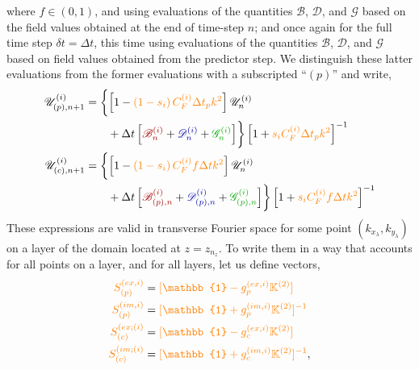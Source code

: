 \documentclass[12pt, letterpaper, oneside, leqno, openright]{memoir}
\newcommand{\bfield}{\mathscr{B}}
\newcommand{\dfield}{\mathscr{D}}
\newcommand{\gfield}{\mathscr{G}}
\newcommand{\ufield}{\mathscr{U}}
\begin{document}
where $f\in (0,1)$, and using evaluations of the quantities 
{\color{red!65!black}$\bfield$},
{\color{blue!65!black}$\dfield$}, 
and 
{\color{green!65!black}$\gfield$} 
based on the field values obtained at the end of time-step $n$; 
and once again for the full time step $\delta t= \Delta t$, 
this time using evaluations of the quantities
{\color{red!65!black}$\bfield$},
{\color{blue!65!black}$\dfield$}, 
and 
{\color{green!65!black}$\gfield$} 
based on field values obtained from the predictor step. 
We distinguish these latter evaluations from the former 
evaluations with a subscripted ``$(p)$'' and write,
%
\begin{subequations}
\begin{align}
  \ufield_{(p),n+1}^{(i)} &= \biggl\{
  \left[ 1 - {\color{orange}\left(1-s_i\right)C^{(i)}_F \Delta t_p k^2}\right] \ufield^{(i)}_n  \nonumber \\
  &\qquad + \Delta t\left[ {\color{red!65!black}\bfield^{(i)}_n} +
  {\color{blue!65!black}\dfield^{(i)}_n}+{\color{green!65!black}\gfield^{(i)}_n}\right]
                    \biggr\}
                    \left[1+{\color{orange}s_iC^{(i)}_F \Delta t_p k^2}\right]^{-1} \\
  \ufield_{(c),n+1}^{(i)} &= \biggl\{
  \left[ 1 - {\color{orange}\left(1-s_i\right)C^{(i)}_F f\Delta t k^2}\right] \ufield^{(i)}_n  \nonumber \\
  &\qquad + \Delta t\left[{\color{red!65!black}\bfield^{(i)}_{(p),n}} +
  {\color{blue!65!black}\dfield^{(i)}_{(p),n}}+{\color{green!65!black}\gfield^{(i)}_{(p),n}}\right]
                    \biggr\}
                    \left[1+{\color{orange}s_iC^{(i)}_F f\Delta t k^2}\right]^{-1}
\end{align}
\end{subequations}
%
These expressions are valid in transverse Fourier space for 
some point $(k_{x_\lambda},k_{y_\lambda})$ on a layer of 
the domain located at $z=z_{n_z}$. To write them in a way
that accounts for all points on a layer, and for all layers, 
let us define vectors,
%
\begin{subequations}
\begin{align}
  { \color{orange} S^{(ex,i)}_{(p)} }  &= {\color{orange}[\mathbb{1} - g^{(ex,i)}_{p} \mathbb{K}^{(2)}]      }  \label{eq:defsexp} \\
  { \color{orange} S^{(im,i)}_{(p)} }  &= {\color{orange}[\mathbb{1} + g^{(im,i)}_{p} \mathbb{K}^{(2)}]^{-1} }  \label{eq:defsimp} \\
  { \color{orange} S^{(ex;(i)}_{(c)} } &= {\color{orange}[\mathbb{1} - g^{(ex,i)}_{c} \mathbb{K}^{(2)}]      }  \label{eq:defsexc} \\
  { \color{orange} S^{(im;(i)}_{(c)} } &= {\color{orange}[\mathbb{1} + g^{(im,i)}_{c} \mathbb{K}^{(2)}]^{-1} }, \label{eq:defsimc}
\end{align}
\end{subequations}
\end{document}

